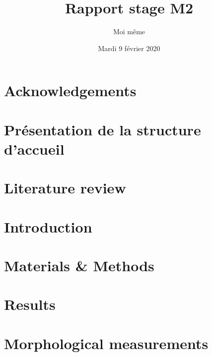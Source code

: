 \documentclass[a4paper, 12pt, hidelinks]{article}
\title{Rapport stage M2}
\author{Moi même}
\date{Mardi 9 février 2020}
\begin{document}
\maketitle
\newpage
\tableofcontents
\newpage


\section{Acknowledgements}
\section{Présentation de la structure d'accueil}
\newpage
\section{Literature review}



\section{Introduction}


\section{Materials \& Methods}

\section{Results}


\appendix
\section{Morphological measurements}







\end{document}
